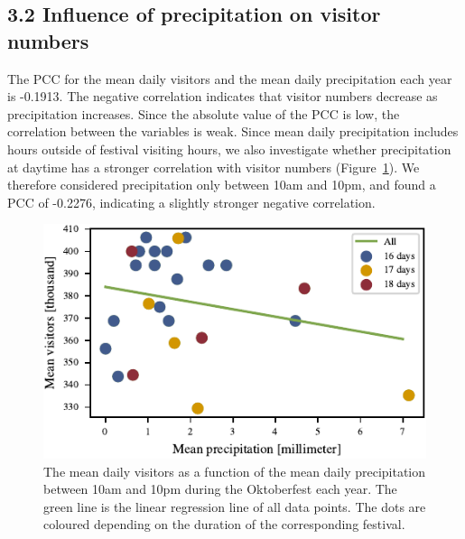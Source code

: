 \documentclass{article}
\theoremstyle{plain}
\theoremstyle{definition}
\theoremstyle{remark}
\begin{document}
\subsection*{3.2 Influence of precipitation on visitor numbers}
The PCC for the mean daily visitors and the mean daily precipitation each year is -0.1913. The negative correlation indicates that visitor numbers decrease as precipitation increases. Since the absolute value of the PCC is low, the correlation between the variables is weak. Since mean daily precipitation includes hours outside of festival visiting hours, we also investigate whether precipitation at daytime has a stronger correlation with visitor numbers (Figure~\ref{figure_precipitation}). We therefore considered precipitation only between 10am and 10pm, and found a PCC of -0.2276, indicating a slightly stronger negative correlation.
\begin{figure}[ht]%
  \includegraphics{fig/totalprecipitation.pdf}
  \caption{The mean daily visitors as a function of the mean daily precipitation between 10am and 10pm during the Oktoberfest each year. The green line is the linear regression line of all data points. The dots are coloured depending on the duration of the corresponding festival.}
  \label{figure_precipitation}
\end{figure}
\end{document}
